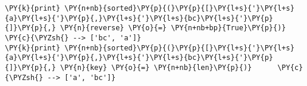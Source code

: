 \begin{Verbatim}[commandchars=\\\{\}]
\PY{k}{print} \PY{n+nb}{sorted}\PY{p}{(}\PY{p}{[}\PY{l+s}{'}\PY{l+s}{a}\PY{l+s}{'}\PY{p}{,}\PY{l+s}{'}\PY{l+s}{bc}\PY{l+s}{'}\PY{p}{]}\PY{p}{,} \PY{n}{reverse} \PY{o}{=} \PY{n+nb+bp}{True}\PY{p}{)} \PY{c}{\PYZsh{} --> ['bc', 'a']}
\PY{k}{print} \PY{n+nb}{sorted}\PY{p}{(}\PY{p}{[}\PY{l+s}{'}\PY{l+s}{a}\PY{l+s}{'}\PY{p}{,}\PY{l+s}{'}\PY{l+s}{bc}\PY{l+s}{'}\PY{p}{]}\PY{p}{,} \PY{n}{key} \PY{o}{=} \PY{n+nb}{len}\PY{p}{)}      \PY{c}{\PYZsh{} --> ['a', 'bc']}
\end{Verbatim}
